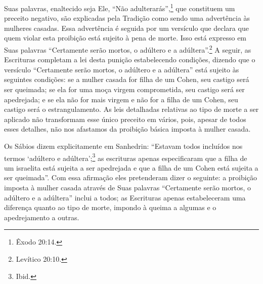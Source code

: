 Suas palavras, enaltecido seja Ele, ``Não adulterarás'',\footnote{Êxodo 20:14.}
que constituem um preceito negativo, são explicadas pela Tradição como
sendo uma advertência às mulheres casadas. Essa advertência é seguida
por um versículo que declara que quem violar esta proibição está sujeito
à pena de morte. Isso está expresso em Suas palavras ``Certamente serão
mortos, o adúltero e a adúltera''.\footnote{Levítico 20:10.} A seguir, as
Escrituras completam a lei desta punição estabelecendo condições,
dizendo que o versículo ``Certamente serão mortos, o adúltero e a
adúltera'' está sujeito às seguintes condições: se a mulher casada for
filha de um Cohen, seu castigo será ser queimada; se ela for uma
moça virgem comprometida, seu castigo será ser apedrejada; e se ela não
for mais virgem e não for a filha de um Cohen, seu castigo será o
estrangulamento. As leis detalhadas relativas ao tipo de morte a ser
aplicado não transformam esse único preceito em vários, pois, apesar de
todos esses detalhes, não nos afastamos da proibição básica imposta à
mulher casada.

Os Sábios dizem explicitamente em Sanhedrin: ``Estavam todos incluídos
nos termos `adúltero e adúltera';\footnote{Ibid.} as escrituras apenas
especificaram que a filha de um israelita está sujeita a ser apedrejada
e que a filha de um Cohen está sujeita a ser queimada''. Com essa
afirmação eles pretenderam dizer o seguinte: a proibição imposta à
mulher casada através de Suas palavras ``Certamente serão mortos, o
adúltero e a adúltera'' inclui a todos; as Escrituras apenas
estabeleceram uma diferença quanto ao tipo de morte, impondo à queima a
algumas e o apedrejamento a outras.

